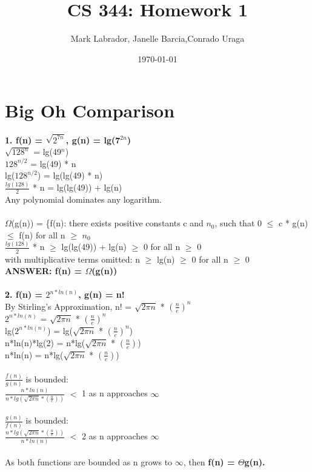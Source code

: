 \documentclass[fleqn]{article}
\title{CS 344: Homework 1 }
\author{Mark Labrador, Janelle Barcia,Conrado Uraga}
\date{\today}
\begin{document}
\maketitle
\section{Big Oh Comparison}         
\textbf{1. f(n) = $\sqrt{2^{7n}}$, g(n) = lg(7$^{2n}$)}\\
$\sqrt{128^{n}}$ = lg(49$^{n}$)\\
${128^{n/2}}$ = lg(49) * n \\
lg(${128^{n/2}}$) = lg(lg(49) * n)\\
$\frac{lg(128)}{2}$ * n = lg(lg(49)) + lg(n)\\
Any polynomial dominates any logarithm.\\\\
$\Omega$(g(n)) = \{f(n): there exists positive constants c and  $n_{0}$, such that 0 $\le$ c * g(n) $\le$ f(n) for all n $\ge$ $n_{0}$\\
$\frac{lg(128)}{2}$ * n $\ge$ lg(lg(49)) + lg(n) $\ge$ 0 for all n $\ge$ 0\\ 
with multiplicative terms omitted: n $\ge$ lg(n) $\ge$ 0 for all n $\ge$ 0\\ 
\textbf{ANSWER: f(n) = $\Omega$(g(n))}\\\\
\textbf{2. f(n) = $2^{n*ln(n)}$, g(n) = n!}\\
By Stirling's Approximation, n! = $\sqrt{2\pi n}$ * $(\frac n e)^{n}$\\
$2^{n*ln(n)}$  = $\sqrt{2\pi n}$ * $(\frac n e)^{n}$\\
lg($2^{n*ln(n)}$)  = lg($\sqrt{2\pi n}$ * $(\frac n e)^{n}$)\\
n*ln(n)*lg(2) = n*lg($\sqrt{2\pi n}$ * $(\frac n e)$)\\
n*ln(n) = n*lg($\sqrt{2\pi n}$ * $(\frac n e)$)\\\\
$\frac{f(n)}{g(n)}$ is bounded:\\
$\frac{n*ln(n)}{n*lg(\sqrt{2\pi n} *(\frac{n}{e}))}$ $<$ 1 as n approaches $\infty$ \\\\
$\frac{g(n)}{f(n)}$ is bounded:\\
$\frac{n*lg(\sqrt{2\pi n} * (\frac n e))}{n*ln(n)}$ $<$ 2 as n approaches $\infty$ \\\\
As both functions are bounded as n grows to $\infty$, then \textbf{f(n) = $\Theta$g(n).}\\
\end{document}
